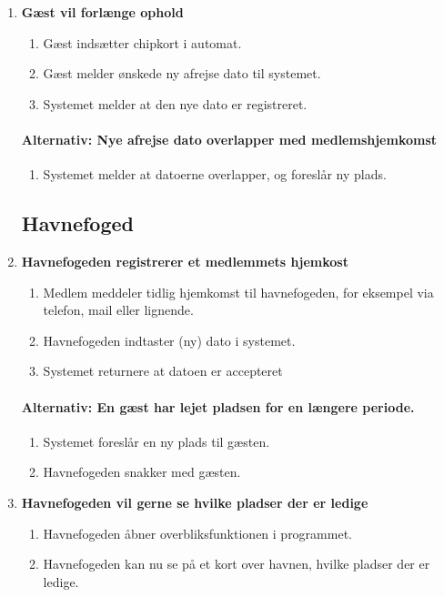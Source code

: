\begin{enumerate}
    \item{\bf{Gæst vil forlænge ophold}}
      \begin{enumerate}
        \item Gæst indsætter chipkort i automat.
        \item Gæst melder ønskede ny afrejse dato til systemet.
        \item Systemet melder at den nye dato er registreret.
      \end{enumerate}

    \paragraph{Alternativ: Nye afrejse dato overlapper med medlemshjemkomst}
      \begin{enumerate}
        \item Systemet melder at datoerne overlapper, og foreslår ny plads.
      \end{enumerate}

\subsection{Havnefoged}
    \item{\bf{Havnefogeden registrerer et medlemmets hjemkost}}
      \begin{enumerate}
        \item Medlem meddeler tidlig hjemkomst til havnefogeden, for eksempel via telefon, mail eller lignende.
        \item Havnefogeden indtaster (ny) dato i systemet.
        \item Systemet returnere at datoen er accepteret
      \end{enumerate}
  
    \paragraph{Alternativ: En gæst har lejet pladsen for en længere periode.}
      \begin{enumerate}
        \item Systemet foreslår en ny plads til gæsten.
        \item Havnefogeden snakker med gæsten.
      \end{enumerate}

    \item{\bf{Havnefogeden vil gerne se hvilke pladser der er ledige}}
      \begin{enumerate}
        \item Havnefogeden åbner overbliksfunktionen i programmet.
        \item Havnefogeden kan nu se på et kort over havnen, hvilke pladser der er ledige.
      \end{enumerate}


\end{enumerate}
